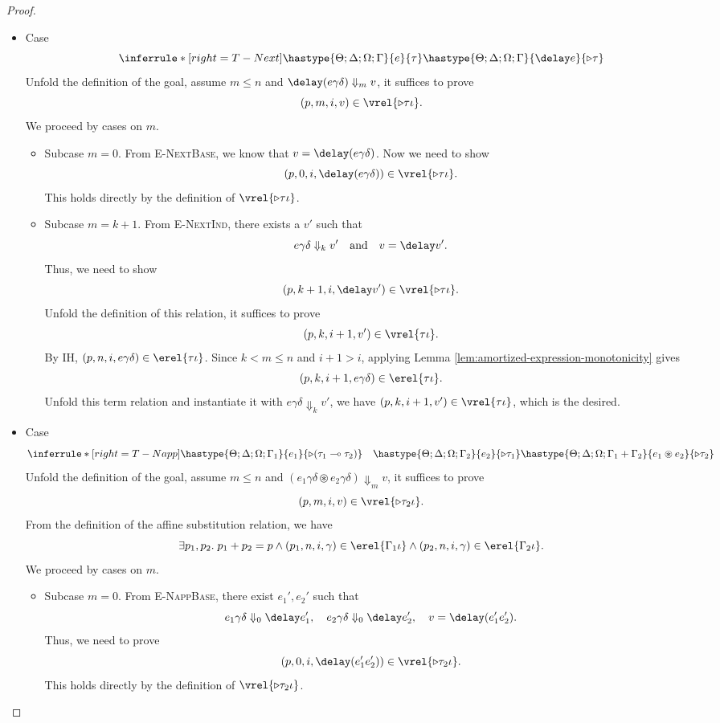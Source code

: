 \begin{proof}
\begin{itemize}
\item Case
\[
  \inferrule*[right=T-Next]
        {\hastype{\Theta;\Delta;\Omega;\Gamma}{e}{\tau}}
        {\hastype{\Theta;\Delta;\Omega;\Gamma}{\delay e}{\triangleright \tau}}
\]
Unfold the definition of the goal, assume $m\leq n$ and
$\delay(e\gamma\delta)\Downarrow_m v$, it suffices to prove
\[(p, m, i, v)\in\vrel{\triangleright\tau\iota}.\]
We proceed by cases on $m$.

\begin{itemize}
\item {Subcase $m=0$.}
From \textsc{E-NextBase}, we know that $v = \delay(e\gamma\delta)$.
Now we need to show
\[(p, 0, i, \delay(e\gamma\delta))\in\vrel{\triangleright\tau\iota}.\]
This holds directly by the definition of $\vrel{\triangleright\tau\iota}$.

\item {Subcase $m=k+1$.}
From \textsc{E-NextInd}, there exists a $v'$ such that
\[
  e\gamma\delta\Downarrow_k v'
  \quad\text{and}\quad
  v=\delay v'.
\]
Thus, we need to show
\[(p, k+1, i, \delay v')\in\vrel{\triangleright\tau\iota}.\]
Unfold the definition of this relation, it suffices to prove
\[(p, k, i+1, v') \in \vrel{\tau\iota}.\]
By IH, $(p, n, i, e\gamma\delta) \in \erel{\tau\iota}$.
Since $k < m \leq n$ and $i+1 > i$, applying Lemma \ref{lem:amortized-expression-monotonicity} gives
\[(p, k, i+1, e\gamma\delta)\in\erel{\tau\iota}.\]
Unfold this term relation and instantiate it with $e\gamma\delta\Downarrow_k v'$, we have
$(p, k, i+1, v') \in \vrel{\tau\iota}$, which is the desired.
\end{itemize}

\item Case
\[
  \inferrule*[right=T-Napp]
        {\hastype{\Theta;\Delta;\Omega;\Gamma_1}{e_1}{\triangleright (\tau_1 \multimap \tau_2)}
         \quad \hastype{\Theta;\Delta;\Omega;\Gamma_2}{e_2}{\triangleright \tau_1}}
        {\hastype{\Theta;\Delta;\Omega;\Gamma_1+\Gamma_2}{e_1 \circledast e_2}{\triangleright \tau_2}}
\]
Unfold the definition of the goal, assume $m\leq n$ and
$(e_1\gamma\delta\circledast e_2\gamma\delta)\Downarrow_m v$, it suffices to prove
\[(p, m, i, v)\in\vrel{\triangleright\tau_2\iota}.\]
From the definition of the affine substitution relation, we have
\[
  \exists p_1, p_2.\;p_1 + p_2= p \land
  (p_1,n,i,\gamma) \in \erel{\Gamma_1\iota} \land
  (p_2,n, i, \gamma) \in \erel{\Gamma_2\iota}.
\]
We proceed by cases on $m$.

\begin{itemize}
\item {Subcase $m=0$.}
From \textsc{E-NappBase}, there exist $e_1', e_2'$ such that
\[
  e_1\gamma\delta \Downarrow_0 \delay e_1', \quad
  e_2\gamma\delta \Downarrow_0 \delay e_2', \quad
  v = \delay(e_1'e_2').
\]
Thus, we need to prove
\[(p, 0, i, \delay(e_1'e_2')) \in \vrel{\triangleright\tau_2\iota}.\]
This holds directly by the definition of $\vrel{\triangleright\tau_2\iota}$.


\end{itemize}
\end{itemize}
\end{proof}
